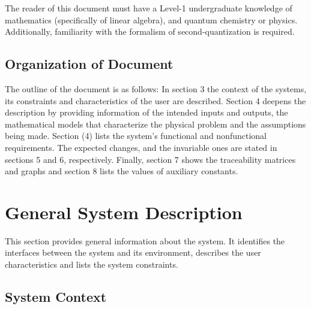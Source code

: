 \documentclass[12pt]{article}
\begin{document}
The reader of this document must have a Level-1 undergraduate knowledge of 
mathematics (specifically of linear algebra), and quantum chemistry or physics. 
Additionally, familiarity with the formalism of second-quantization is required.

\subsection{Organization of Document}

	The outline of the document is as follows: In section 3 the context of the 
systems, its constraints and characteristics of the user are described. Section 
4 deepens the description by providing information of the intended inputs and 
outputs, the mathematical models that characterize the physical problem and the 
assumptions being made. Section (4) lists the system's functional and 
nonfunctional requirements. The expected changes, and the invariable ones are 
stated in sections 5 and 6, respectively. Finally, section 7 shows the 
traceability matrices and graphs and section 8 lists the values of auxiliary 
constants.

\section{General System Description}

This section provides general information about the system.  It identifies the
interfaces between the system and its environment, describes the user
characteristics and lists the system constraints. 
%

\subsection{System Context}
\end{document}

